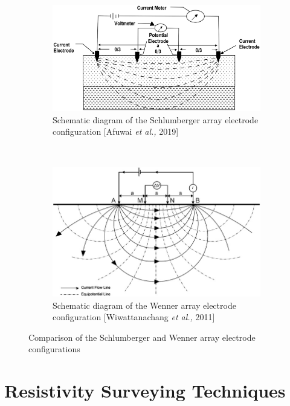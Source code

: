 \documentclass[12pt,a4paper]{report}
\begin{document}
\begin{figure}[H]
    \centering
    \begin{subfigure}[t]{0.9\textwidth}
        \centering
        \includegraphics[height=0.3\textheight]{sclumberger.png}
        \caption{Schematic diagram of the Schlumberger array electrode configuration [Afuwai \textit{et al.,} 2019] }
        \label{fig:schlumberger}
    \end{subfigure}\\[2cm]
    \vspace{1cm}
    \begin{subfigure}[t]{0.9\textwidth}
        \centering
        \includegraphics[height=0.35\textheight]{wenner.png}
        \caption{Schematic diagram of the Wenner array electrode configuration [Wiwattanachang \textit{et al.,} 2011]}
        \label{fig:wenner}
    \end{subfigure}
    \caption{Comparison of the Schlumberger and Wenner array electrode configurations }
    \label{fig:configurations}
\end{figure}

\section{Resistivity Surveying Techniques}
\end{document}
